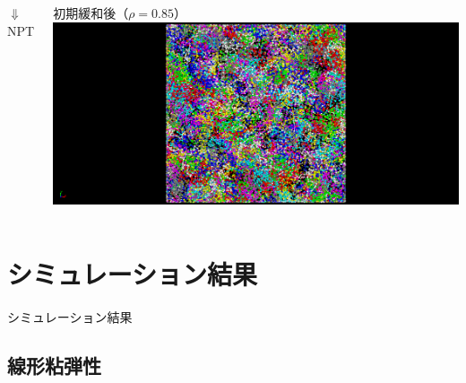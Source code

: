 \documentclass[11pt, dvipdfmx]{beamer}
\begin{document}
\begin{frame}
\begin{columns}[T, totalwidth=1\linewidth]
\vspace{-3mm}
\begin{center}
$\Downarrow$ NPT
\end{center}
\vspace{-3mm}

初期緩和後（$\rho =0.85$）
\includegraphics[width=\columnwidth]{./fig/after.png}
\end{columns}
\end{frame}

%
\section{シミュレーション結果}
\begin{frame}
\Large{シミュレーション結果}
\end{frame}

\subsection{線形粘弾性}
\end{document}
